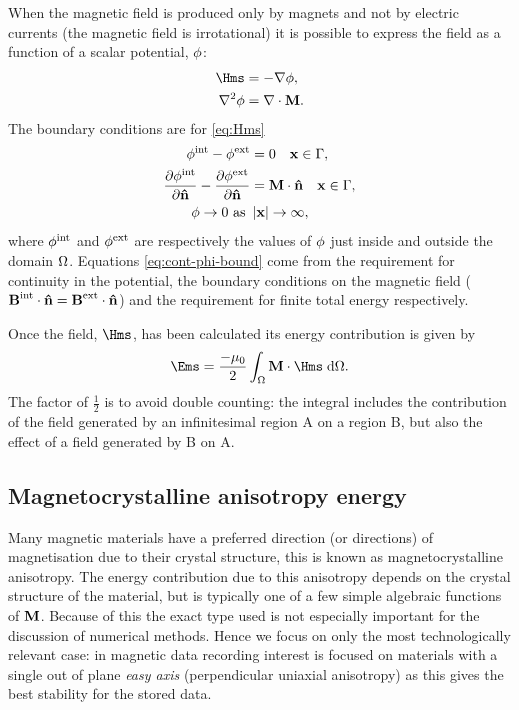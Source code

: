 When the magnetic field is produced only by magnets and not by electric currents (\ie the magnetic field is irrotational) it is possible to express the field as a function of a scalar potential, $\phi$: %
\begin{equation}
  \begin{aligned}
    \label{eq:Hms}
    \Hms &= - \grad \phim, \\
    \lap \phim &= \div \Mv.
  \end{aligned}
\end{equation}
The boundary conditions are for \cref{eq:Hms}
\begin{equation}
  \begin{aligned}
    \label{eq:cont-phi-bound}
    \phi^{\mathrm{int}} - \phi^{\mathrm{ext}} &= 0 \quad \boldsymbol{\mathrm{x}} \in {\Gamma}, \\
    \frac{\partial \phi^{\mathrm{int}}}{\partial \boldsymbol{\mathrm{\hat{n}}}} - \frac{\partial \phi^{\mathrm{ext}}}{\partial \boldsymbol{\mathrm{\hat{n}}}} &= \boldsymbol{\mathrm{M}} \cdot \boldsymbol{\mathrm{\hat{n}}} \quad \boldsymbol{\mathrm{x}} \in {\Gamma}, \\
    \phi \rightarrow 0 \text{ as } &\left|{\boldsymbol{\mathrm{x}}} \right| \rightarrow \infty,
  \end{aligned}
\end{equation}
where $\phi^{\mathrm{int}}$ and $\phi^{\mathrm{ext}}$ are respectively the values of $\phi$ just inside and outside the domain $\Omega$.
Equations \eqref{eq:cont-phi-bound} come from the requirement for continuity in the potential, the boundary conditions on the magnetic field ($\boldsymbol{\mathrm{B}}^\text{int} \cdot \boldsymbol{\mathrm{\hat{n}}} = \boldsymbol{\mathrm{B}}^\text{ext} \cdot \boldsymbol{\mathrm{\hat{n}}}$) and the requirement for finite total energy respectively.




Once the field, $\Hms$, has been calculated its energy contribution is given by
\begin{equation}
  \label{eq:41}
  \Ems =  \frac{-\mu_0}{2} \int_{\magd} \Mv \cdot \Hms \d \magd.
\end{equation}
The factor of $\frac{1}{2}$ is to avoid double counting: the integral includes the contribution of the field generated by an infinitesimal region A on a region B, but also the effect of a field generated by B on A.

\subsection{Magnetocrystalline anisotropy energy}
\label{sec:magn-anis}

Many magnetic materials have a preferred direction (or directions) of magnetisation due to their crystal structure, this is known as magnetocrystalline anisotropy.
The energy contribution due to this anisotropy depends on the crystal structure of the material, but is typically one of a few simple algebraic functions of $\boldsymbol{\mathrm{M}}$.
Because of this the exact type used is not especially important for the discussion of numerical methods.
Hence we focus on only the most technologically relevant case: in magnetic data recording interest is focused on materials with a single out of plane \emph{easy axis} (perpendicular uniaxial anisotropy) as this gives the best stability for the stored data.

